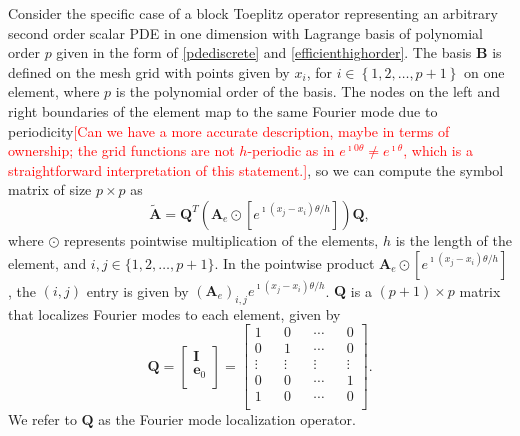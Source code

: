 \documentclass[review]{siamart190516}
\newcommand{\todo}[1]{\textcolor{red}{[#1]}}
\begin{document}
Consider the specific case of a block Toeplitz operator representing an arbitrary second order scalar PDE in one dimension with Lagrange basis of polynomial order $p$ given in the form of \cref{pdediscrete} and \cref{efficienthighorder}.
The basis $\mathbf{B}$ is defined on the mesh grid with points given by $x_i$, for $i \in \left\lbrace 1, 2, \dots, p + 1 \right\rbrace$ on one element, where $p$ is the polynomial order of the basis.
The nodes on the left and right boundaries of the element map to the same Fourier mode due to periodicity\todo{Can we have a more accurate description, maybe in terms of ownership; the grid functions are not $h$-periodic as in $e^{\imath 0 \theta} \ne e^{\imath\theta}$, which is a straightforward interpretation of this statement.}, so we can compute the symbol matrix of size $p \times p$ as
\begin{equation}\label{symbolscalar1d}
\tilde{\mathbf{A}} = \mathbf{Q}^T \left( \mathbf{A}_e \odot \left[ e^{\imath \left( x_j - x_i \right) \theta / h} \right] \right) \mathbf{Q},
\end{equation}
where $\odot$ represents pointwise multiplication of the elements, $h$ is the length of the element, and $i, j \in \lbrace 1, 2, \dots, p + 1 \rbrace$.
In the pointwise product $\mathbf{A}_e \odot \left[ e^{\imath \left( x_j - x_i \right) \theta / h} \right]$, the $\left( i, j \right)$ entry is given by $\left( \mathbf{A}_e \right)_{i, j} e^{\imath \left( x_j - x_i \right) \theta / h}$.
$\mathbf{Q}$ is a $\left( p + 1 \right) \times p$ matrix that localizes Fourier modes to each element, given by
\begin{equation}
\mathbf{Q} =
\begin{bmatrix}
    \mathbf{I}   \\
    \mathbf{e}_0 \\
\end{bmatrix} =
\begin{bmatrix}
    1      && 0      && \cdots && 0      \\
    0      && 1      && \cdots && 0      \\
    \vdots && \vdots && \vdots && \vdots \\
    0      && 0      && \cdots && 1      \\
    1      && 0      && \cdots && 0      \\
\end{bmatrix}.
\end{equation}
We refer to $\mathbf{Q}$ as the Fourier mode localization operator.
\end{document}
